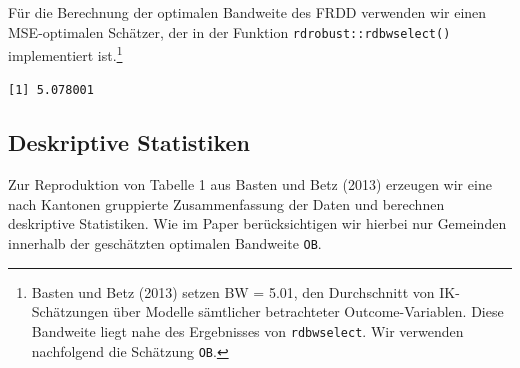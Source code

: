 \documentclass[
  a4paper,
  DIV=11,
  oneside]{scrreprt}
\newenvironment{Shaded}{\begin{snugshade}}{\end{snugshade}}
\newcommand{\AttributeTok}[1]{\textcolor[rgb]{0.40,0.45,0.13}{#1}}
\newcommand{\CommentTok}[1]{\textcolor[rgb]{0.37,0.37,0.37}{#1}}
\newcommand{\DecValTok}[1]{\textcolor[rgb]{0.68,0.00,0.00}{#1}}
\newcommand{\FunctionTok}[1]{\textcolor[rgb]{0.28,0.35,0.67}{#1}}
\newcommand{\NormalTok}[1]{\textcolor[rgb]{0.00,0.23,0.31}{#1}}
\newcommand{\OtherTok}[1]{\textcolor[rgb]{0.00,0.23,0.31}{#1}}
\newcommand{\SpecialCharTok}[1]{\textcolor[rgb]{0.37,0.37,0.37}{#1}}
\newcommand{\StringTok}[1]{\textcolor[rgb]{0.13,0.47,0.30}{#1}}
\begin{document}
Für die Berechnung der optimalen Bandweite des FRDD verwenden wir einen
MSE-optimalen Schätzer, der in der Funktion
\texttt{rdrobust::rdbwselect()} implementiert ist.\footnote{Basten und
  Betz (2013) setzen BW = 5.01, den Durchschnitt von IK-Schätzungen über
  Modelle sämtlicher betrachteter Outcome-Variablen. Diese Bandweite
  liegt nahe des Ergebnisses von \texttt{rdbwselect}. Wir verwenden
  nachfolgend die Schätzung \texttt{OB}.}

\begin{Shaded}
\end{Shaded}

\begin{verbatim}
[1] 5.078001
\end{verbatim}

\hypertarget{deskriptive-statistiken}{%
\subsection{Deskriptive Statistiken}\label{deskriptive-statistiken}}

Zur Reproduktion von Tabelle 1 aus Basten und Betz (2013) erzeugen wir
eine nach Kantonen gruppierte Zusammenfassung der Daten und berechnen
deskriptive Statistiken. Wie im Paper berücksichtigen wir hierbei nur
Gemeinden innerhalb der geschätzten optimalen Bandweite \texttt{OB}.
\end{document}
